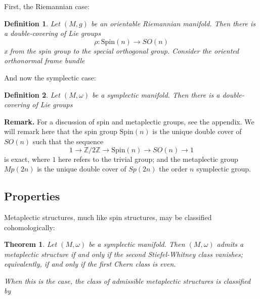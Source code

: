 \documentclass{tufte-handout}
\newtheorem{thrm}{Theorem} %
\newtheorem{defn}{Definition} %
\begin{document}
First, the Riemannian case:
\begin{fullwidth}
\begin{defn}
Let $(M,g)$ be an orientable Riemannian manifold. Then there is a double-covering of Lie groups
$$
\rho : \mathrm{Spin}(n) \to SO(n)
$$x
from the spin group to the special orthogonal group. Consider the oriented orthonormal frame bundle %
\end{defn}
\end{fullwidth}

And now the symplectic case:
\begin{fullwidth}
\begin{defn}
Let $(M,\omega)$ be a symplectic manifold. Then there is a double-covering of Lie groups
\end{defn}
\end{fullwidth}

\textbf{Remark.} For a discussion of spin and metaplectic groups, see the appendix. We will remark here that the spin group $\mathrm{Spin}(n)$ is the unique double cover of $SO(n)$ such that the sequence
$$
1 \to \mathbb{Z}/2\mathbb{Z} \to \mathrm{Spin}(n) \to SO(n) \to 1
$$
is exact, where $1$ here refers to the trivial group; and the metaplectic group $Mp(2n)$ is the unique double cover of $Sp(2n)$ the order $n$ symplectic group.
\subsection{Properties}
Metaplectic structures, much like spin structures, may be classified cohomologically:
\begin{fullwidth}
\begin{thrm}
Let $(M,\omega)$ be a symplectic manifold. Then $(M,\omega)$ admits a metaplectic structure if and only if the second Stiefel-Whitney class vanishes; equivalently, if and only if the first Chern class is even.


When this is the case, the class of admissible metaplectic structures is classified by %
\end{thrm}
\end{fullwidth}
\end{document}
